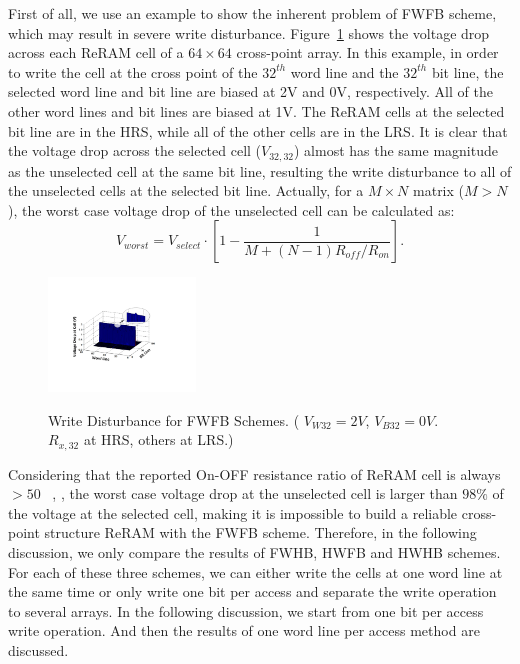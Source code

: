 First of all, we use an example to show the inherent problem of FWFB scheme, which may result in severe write disturbance.
Figure~\ref{fig:FWFR} shows the voltage drop across each ReRAM cell of a $64 \times 64$ cross-point array. In this example, in order to write the cell at the cross point of the $32^{th}$ word line and the $32^{th}$ bit line, the selected word line and bit line are biased at 2V and 0V, respectively. All of the other word lines and bit lines are biased at 1V. The ReRAM cells at the selected bit line are in the HRS, while all of the other cells are in the LRS. It is clear that the voltage drop across the selected cell ($V_{32,32}$) almost has the same magnitude as the unselected cell at the same bit line, resulting the write disturbance to all of the unselected cells at the selected bit line. Actually, for a $M \times N$ matrix ($M>N$), the worst case voltage drop of the unselected cell can be calculated as:
\begin{equation}\label{worst_FWFB}
V_{worst}=V_{select} \cdot [1-\frac{1}{M+(N-1)R_{off}/R_{on}}].
\end{equation}

\begin{figure}[!b]
\centering
  \includegraphics[width=0.35\textwidth]{./figures/FWFB4.pdf}\\
  \caption{Write Disturbance for FWFB Schemes. ( $V_{W32} = 2V$, $V_{B32} = 0V$. $R_{x,32}$ at HRS, others at LRS.) }\label{fig:FWFR}
\end{figure}
Considering that the reported On-OFF resistance ratio of
ReRAM cell is always $>50$ ~\cite{ReRAM_IEDM2010_Ho,ReRAM_IEDM2010_Chien,ReRAM_IEDM2010_Lee_Diode,ReRAM_IEDM2010_Lee_Evidence,ReRAM_ISSCC2011_Sheu,ReRAM_ISSCC2011_Otsuka},
, the worst case voltage drop at the unselected cell is larger than $98\%$ of the voltage at the selected cell, making it is impossible to build a reliable cross-point structure ReRAM with the FWFB scheme. Therefore, in the following discussion, we only compare the results of FWHB, HWFB and HWHB schemes. For each of these three schemes, we can either write the cells at one word line at the same time or only write one bit per access and separate the write operation to several arrays. In the
following discussion, we start from one bit per access write operation.
And then the results of one word line per access method are discussed.



